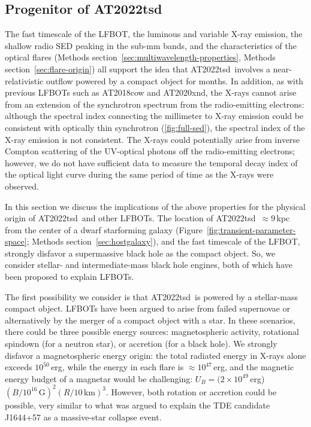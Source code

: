 \documentclass{nature_plusfigure}
\newcommand{\at}{AT2022tsd}
\begin{document}
\begin{methods}
\section{Progenitor of \at}
\label{sec:at2022tsd-origin}

The fast timescale of the LFBOT, the luminous and variable X-ray emission, the shallow radio SED peaking in the sub-mm bands, and the characteristics of the optical flares (Methods section~\ref{sec:multiwavelength-properties}, Methods section~\ref{sec:flare-origin}) all support the idea that \at\ involves a near-relativistic outflow powered by a compact object for months.
In addition, as with previous LFBOTs such as AT2018cow and AT2020xnd, the X-rays cannot arise from an extension of the synchrotron spectrum from the radio-emitting electrons\cite{Margutti2019,Ho2019,Ho2022_AT2020xnd}: although the spectral index connecting the millimeter to X-ray emission could be consistent with optically thin synchrotron (\ref{fig:full-sed}), the spectral index of the X-ray emission is not consistent.
The X-rays could potentially arise from inverse Compton scattering of the UV-optical photons off the radio-emitting electrons; however, we do not have sufficient data to measure the temporal decay index of the optical light curve during the same period of time as the X-rays were observed.

In this section we discuss the implications of the above properties for the physical origin of \at\ and other LFBOTs. The location of \at\ $\approx9\,$kpc from the center of a dwarf starforming galaxy (Figure~\ref{fig:transient-parameter-space}; Methods section~\ref{sec:hostgalaxy}), and the fast timescale of the LFBOT, strongly disfavor a supermassive black hole as the compact object. So, we consider stellar- and intermediate-mass black hole engines, both of which have been proposed to explain LFBOTs\cite{Perley2019,Margutti2019,Metzger2022,Chen2023}. 

The first possibility we consider is that \at\ is powered by a stellar-mass compact object. LFBOTs have been argued to arise from failed supernovae\cite{Perley2019,Margutti2019} or alternatively by the merger of a compact object with a star\cite{Metzger2022}. In these scenarios, there could be three possible energy sources: magnetospheric activity, rotational spindown (for a neutron star), or accretion (for a black hole). We strongly disfavor a magnetospheric energy origin: the total radiated energy in X-rays alone exceeds $10^{50}\,$erg, while the energy in each flare is $\approx10^{47}\,$erg, and the magnetic energy budget of a magnetar would be challenging: $U_B = (2\times10^{49}\,$erg)$(B/10^{16}\,\mathrm{G})^2 (R/10\,\mathrm{km})^3$. However, both rotation or accretion could be possible, very similar to what was argued to explain the TDE candidate J1644+57 as a massive-star collapse event\cite{Quataert2012}. 


\end{methods}
\end{document}
